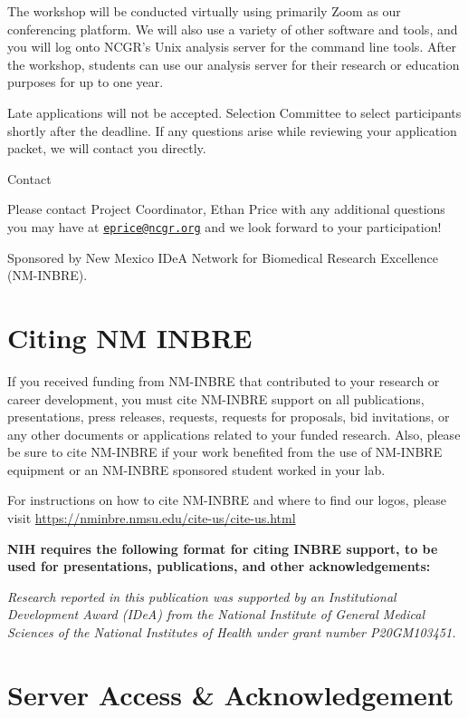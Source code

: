 \documentclass[
]{book}
\begin{document}
The workshop will be conducted virtually using primarily Zoom as our conferencing platform. We will also use a variety of other software and tools, and you will log onto NCGR's Unix analysis server for the command line tools. After the workshop, students can use our analysis server for their research or education purposes for up to one year.

Late applications will not be accepted. Selection Committee to select participants shortly after the deadline. If any questions arise while reviewing your application packet, we will contact you directly.

Contact

Please contact Project Coordinator, Ethan Price with any additional questions you may have at \href{mailto:eprice@ncgr.org}{\nolinkurl{eprice@ncgr.org}} and we look forward to your participation!

Sponsored by New Mexico IDeA Network for Biomedical Research Excellence (NM-INBRE).

\hypertarget{citing-nm-inbre}{%
\chapter*{Citing NM INBRE}\label{citing-nm-inbre}}

If you received funding from NM-INBRE that contributed to your research or career development, you must cite NM-INBRE support on all publications, presentations, press releases, requests, requests for proposals, bid invitations, or any other documents or applications related to your funded research. Also, please be sure to cite NM-INBRE if your work benefited from the use of NM-INBRE equipment or an NM-INBRE sponsored student worked in your lab.

For instructions on how to cite NM-INBRE and where to find our logos, please visit \url{https://nminbre.nmsu.edu/cite-us/cite-us.html}

{\textbf{NIH requires the following format for citing INBRE support, to be used for presentations, publications, and other acknowledgements:}}

{\emph{Research reported in this publication was supported by an Institutional Development Award (IDeA) from the National Institute of General Medical Sciences of the National Institutes of Health under grant number P20GM103451.}}

\hypertarget{server-access-acknowledgement}{%
\chapter*{Server Access \& Acknowledgement}\label{server-access-acknowledgement}}
\end{document}
